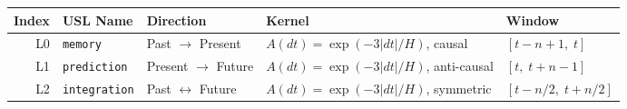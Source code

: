 \begin{table}[H]
\centering
\begin{tabular}{r l l l l}
\toprule
\textbf{Index} & \textbf{USL Name} & \textbf{Direction} & \textbf{Kernel} & \textbf{Window} \\
\midrule
L0 & \texttt{memory}      & Past $\to$ Present   & $A(dt) = \exp(-3|dt|/H)$, causal       & $[t{-}n{+}1,\; t]$     \\
L1 & \texttt{prediction}  & Present $\to$ Future  & $A(dt) = \exp(-3|dt|/H)$, anti-causal  & $[t,\; t{+}n{-}1]$     \\
L2 & \texttt{integration} & Past $\leftrightarrow$ Future & $A(dt) = \exp(-3|dt|/H)$, symmetric    & $[t{-}n/2,\; t{+}n/2]$ \\
\bottomrule
\end{tabular}
\end{table}
